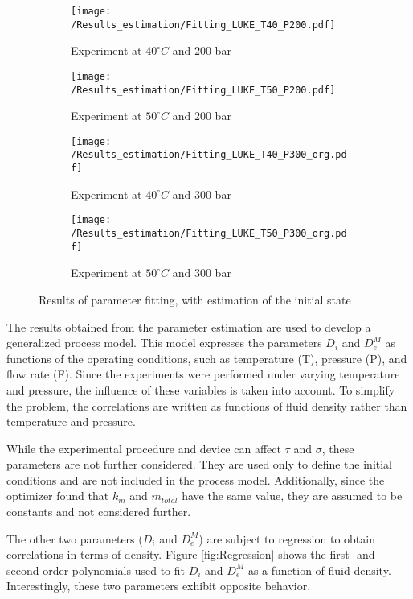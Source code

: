 \documentclass[../Article_Model_Parameters.tex]{subfiles}
\begin{document}
		\begin{figure}[!h]
		\centering
		\begin{subfigure}[b]{\columnwidth}
			\centering
			\texttt{[image: /Results\_estimation/Fitting\_LUKE\_T40\_P200.pdf]}
			\caption{Experiment at $40^\circ C$ and $200$ bar}
		\end{subfigure}
		\begin{subfigure}[b]{\columnwidth}
			\centering
			\texttt{[image: /Results\_estimation/Fitting\_LUKE\_T50\_P200.pdf]}
			\caption{Experiment at $50^\circ C$ and $200$ bar}
		\end{subfigure}
		\begin{subfigure}[b]{\columnwidth}
			\centering
			\texttt{[image: /Results\_estimation/Fitting\_LUKE\_T40\_P300\_org.pdf]}
			\caption{Experiment at $40^\circ C$ and $300$ bar}
		\end{subfigure}
		\begin{subfigure}[b]{\columnwidth}
			\centering
			\texttt{[image: /Results\_estimation/Fitting\_LUKE\_T50\_P300\_org.pdf]}
			\caption{Experiment at $50^\circ C$ and $300$ bar}
		\end{subfigure}
		\caption{Results of parameter fitting, with estimation of the initial state}
		\label{fig: estimation_results}
	\end{figure}

	The results obtained from the parameter estimation are used to develop a generalized process model. This model expresses the parameters $D_i$ and $D_e^M$ as functions of the operating conditions, such as temperature (T), pressure (P), and flow rate (F). Since the experiments were performed under varying temperature and pressure, the influence of these variables is taken into account. To simplify the problem, the correlations are written as functions of fluid density rather than temperature and pressure.
	
	While the experimental procedure and device can affect $\tau$ and $\sigma$, these parameters are not further considered. They are used only to define the initial conditions and are not included in the process model. Additionally, since the optimizer found that $k_m$ and $m_{total}$ have the same value, they are assumed to be constants and not considered further.
	
	The other two parameters ($D_i$ and $D_e^M$) are subject to regression to obtain correlations in terms of density. Figure \ref{fig:Regression} shows the first- and second-order polynomials used to fit $D_i$ and $D_e^M$ as a function of fluid density. Interestingly, these two parameters exhibit opposite behavior.
\end{document}

